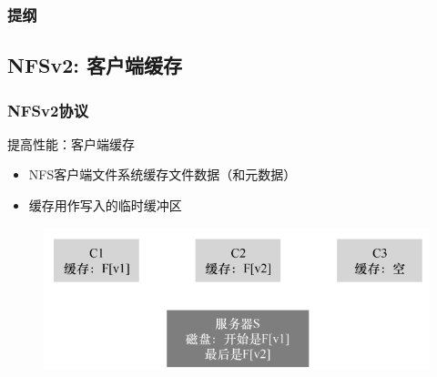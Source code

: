 \begin{frame}
    \frametitle{提纲} %
    \tableofcontents %
    
    
\end{frame}
    \subsection{NFSv2: 客户端缓存}
\begin{frame}[fragile]
    \frametitle{NFSv2协议}
    提高性能：客户端缓存
    
    \begin{itemize}
        \item NFS客户端文件系统缓存文件数据（和元数据）
        \item 缓存用作写入的临时缓冲区
    \end{itemize}

        \begin{figure}
            \includegraphics[width=0.7\linewidth]{figs/nfsv2-cache.png}
        \end{figure}
    
\end{frame}

